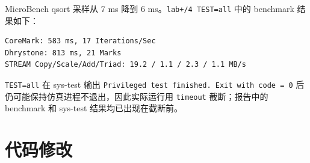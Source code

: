 \documentclass[UTF8,a4paper,11pt]{ctexart}
\begin{document}
MicroBench qsort 采样从 7 ms 降到 6 ms。\texttt{lab+/4 TEST=all} 中的 benchmark 结果如下：

\begin{Verbatim}[fontsize=\small]
CoreMark: 583 ms, 17 Iterations/Sec
Dhrystone: 813 ms, 21 Marks
STREAM Copy/Scale/Add/Triad: 19.2 / 1.1 / 2.3 / 1.1 MB/s
\end{Verbatim}

\texttt{TEST=all} 在 sys-test 输出 \texttt{Privileged test finished. Exit with code = 0} 后仍可能保持仿真进程不退出，因此实际运行用 \texttt{timeout} 截断；报告中的 benchmark 和 sys-test 结果均已出现在截断前。

\section{代码修改}
\end{document}
